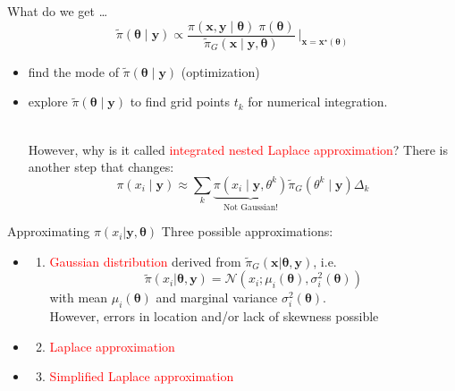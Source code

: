 \documentclass[
  ignorenonframetext,
]{beamer}
\providecommand{\tightlist}{%
  \setlength{\itemsep}{0pt}\setlength{\parskip}{0pt}}
\begin{document}
\begin{frame}{What do we get \ldots{}}
\protect\hypertarget{what-do-we-get}{}
\[
\widetilde{\pi}(\mathbf{\theta} \mid \mathbf{y}) \propto  \frac{
           \pi(\mathbf{x}, \mathbf{y}\mid \mathbf{\theta})
        \; \pi(\mathbf{\theta})}{\widetilde{\pi}_G(\mathbf{x} \mid \mathbf{y},
            \mathbf{\theta})} \: \Bigg|_{\mathbf{x} = \mathbf{x}^\star(\mathbf{\theta})}
\]

\begin{itemize}
\item
  find the mode of \(\widetilde{\pi}(\mathbf{\theta}\mid \mathbf{y})\)
  (optimization)
\item
  explore \(\widetilde{\pi}(\mathbf{\theta}\mid \mathbf{y})\) to find
  grid points \(t_k\) for numerical integration.\\
  \strut \\
  \pause However, why is it called
  \textcolor{red}{integrated nested Laplace
      approximation}? \pause There is another step that changes: \[
  \pi(x_{i} \mid \mathbf{y}) \approx \sum_k \underbrace{\pi(x_{i} \mid \mathbf{y}, \theta^k)}_{{\text{Not Gaussian!}}}{\widetilde{\pi}_G(\theta^k\mid\mathbf{y})} \Delta_k
  \]
\end{itemize}
\end{frame}

\begin{frame}{Approximating \(\pi(x_i|\mathbf{y}, \mathbf{\theta})\)}
\protect\hypertarget{approximating-pix_imathbfy-mathbftheta}{}
Three possible approximations:

\begin{itemize}[<+->]
\item
  \begin{enumerate}[<+->]
  \tightlist
  \item
    \textcolor{red}{Gaussian distribution} derived from
    \(\widetilde{\pi}_G(\mathbf{x}|\mathbf{\theta}, \mathbf{y})\), i.e.
    \[
    \widetilde{\pi}(x_i|\mathbf{\theta}, \mathbf{y}) = \mathcal{N}(x_i; \mu_i(\mathbf{\theta}), \sigma_i^2(\mathbf{\theta}))
    \] with mean \(\mu_i(\mathbf{\theta})\) and marginal variance
    \(\sigma_i^2(\mathbf{\theta})\).\\
    However, errors in location and/or lack of skewness possible
  \end{enumerate}
\end{itemize}

\begin{itemize}[<+->]
\item
  \begin{enumerate}[<+->]
  \setcounter{enumi}{1}
  \tightlist
  \item
    \textcolor{red}{Laplace approximation}
  \end{enumerate}
\item
  \begin{enumerate}[<+->]
  \setcounter{enumi}{2}
  \tightlist
  \item
    \textcolor{red}{Simplified Laplace approximation}
  \end{enumerate}
\end{itemize}
\end{frame}
\end{document}

